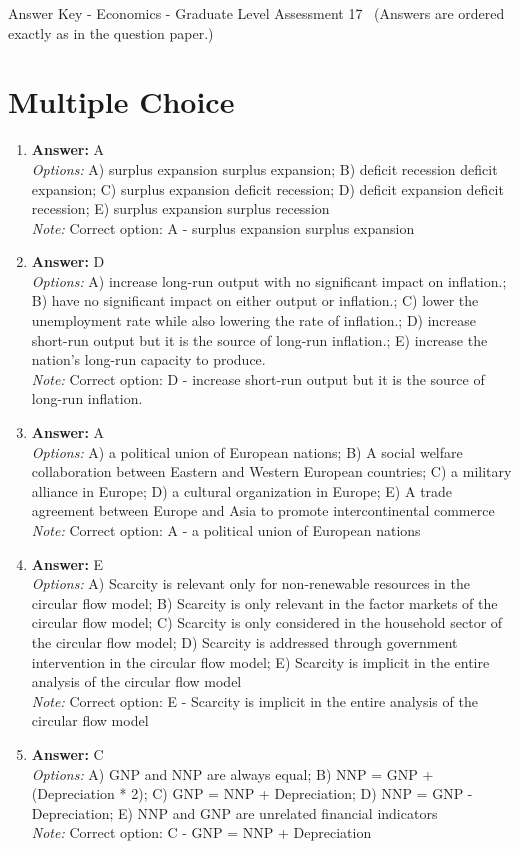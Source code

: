 \documentclass[12pt]{article}
\begin{document}
\begin{center}
Answer Key - Economics - Graduate Level Assessment 17 \
\small (Answers are ordered exactly as in the question paper.)
\end{center}

\section*{Multiple Choice}
\begin{enumerate}[label=\arabic*.]
\item \textbf{Answer:} A
\\ \textit{Options:} A) surplus expansion surplus expansion; B) deficit recession deficit expansion; C) surplus expansion deficit recession; D) deficit expansion deficit recession; E) surplus expansion surplus recession
\\ \textit{Note:} Correct option: A - surplus expansion surplus expansion
\item \textbf{Answer:} D
\\ \textit{Options:} A) increase long-run output with no significant impact on inflation.; B) have no significant impact on either output or inflation.; C) lower the unemployment rate while also lowering the rate of inflation.; D) increase short-run output but it is the source of long-run inflation.; E) increase the nation's long-run capacity to produce.
\\ \textit{Note:} Correct option: D - increase short-run output but it is the source of long-run inflation.
\item \textbf{Answer:} A
\\ \textit{Options:} A) a political union of European nations; B) A social welfare collaboration between Eastern and Western European countries; C) a military alliance in Europe; D) a cultural organization in Europe; E) A trade agreement between Europe and Asia to promote intercontinental commerce
\\ \textit{Note:} Correct option: A - a political union of European nations
\item \textbf{Answer:} E
\\ \textit{Options:} A) Scarcity is relevant only for non-renewable resources in the circular flow model; B) Scarcity is only relevant in the factor markets of the circular flow model; C) Scarcity is only considered in the household sector of the circular flow model; D) Scarcity is addressed through government intervention in the circular flow model; E) Scarcity is implicit in the entire analysis of the circular flow model
\\ \textit{Note:} Correct option: E - Scarcity is implicit in the entire analysis of the circular flow model
\item \textbf{Answer:} C
\\ \textit{Options:} A) GNP and NNP are always equal; B) NNP = GNP + (Depreciation * 2); C) GNP = NNP + Depreciation; D) NNP = GNP - Depreciation; E) NNP and GNP are unrelated financial indicators
\\ \textit{Note:} Correct option: C - GNP = NNP + Depreciation
\end{enumerate}
\end{document}
